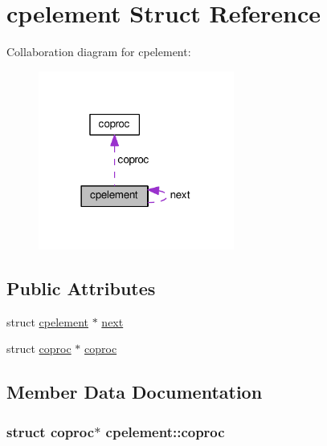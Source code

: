 \hypertarget{structcpelement}{}\section{cpelement Struct Reference}
\label{structcpelement}


Collaboration diagram for cpelement\+:
\nopagebreak
\begin{figure}[H]
\begin{center}
\leavevmode
\includegraphics[width=182pt]{structcpelement__coll__graph}
\end{center}
\end{figure}
\subsection*{Public Attributes}
\begin{DoxyCompactItemize}
\item 
struct \hyperlink{structcpelement}{cpelement} $\ast$ \hyperlink{structcpelement_aad9f602c3450059111014c2c7d95e201}{next}
\item 
struct \hyperlink{structcoproc}{coproc} $\ast$ \hyperlink{structcpelement_a7793e7ecb45eab4e88d795af267f4386}{coproc}
\end{DoxyCompactItemize}


\subsection{Member Data Documentation}
\subsubsection[{\texorpdfstring{coproc}{coproc}}]{\setlength{\rightskip}{0pt plus 5cm}struct {\bf coproc}$\ast$ cpelement\+::coproc}\hypertarget{structcpelement_a7793e7ecb45eab4e88d795af267f4386}{}\label{structcpelement_a7793e7ecb45eab4e88d795af267f4386}
